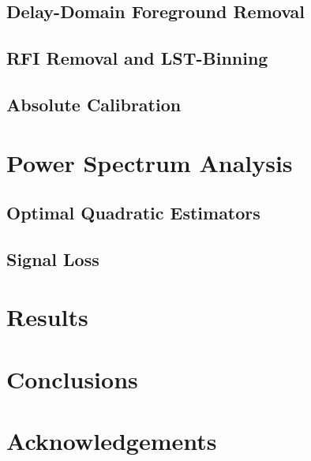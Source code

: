 \documentclass[preprint2,numberedappendix,tighten,twocolappendix]{aastex6}  %
\begin{document}
\subsection{Delay-Domain Foreground Removal}

\subsection{RFI Removal and LST-Binning}

\subsection{Absolute Calibration}

\section{Power Spectrum Analysis}
\label{sec:PS}

\subsection{Optimal Quadratic Estimators}
\label{sec:OQE}

\subsection{Signal Loss}
\label{sec:Sigloss}

\section{Results}
\label{sec:Res}

\section{Conclusions}
\label{sec:Con}

\section{Acknowledgements}
\label{sec:Ack}



\end{document}

